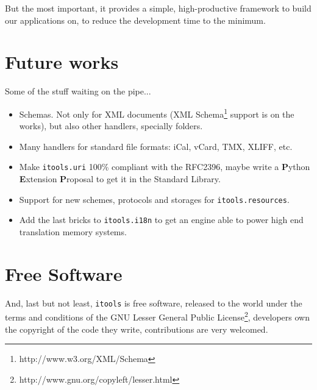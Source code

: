 But the most important, it provides a simple, high-productive framework
to build our applications on, to reduce the development time to the
minimum.

\section{Future works}

Some of the stuff waiting on the pipe...

\begin{itemize}
  \item Schemas. Not only for XML documents (XML
    Schema\footnote{http://www.w3.org/XML/Schema} support is on the works),
    but also other handlers, specially folders.

  \item Many handlers for standard file formats: iCal, vCard, TMX, XLIFF, etc.

  \item Make {\tt itools.uri} 100\% compliant with the RFC2396,
    maybe write a {\bf P}ython {\bf E}xtension {\bf P}roposal to
    get it in the Standard Library.

  \item Support for new schemes, protocols and storages for
    {\tt itools.resources}.

  \item Add the last bricks to {\tt itools.i18n} to get an engine able
    to power high end translation memory systems.
\end{itemize}


\section{Free Software}

And, last but not least, {\tt itools} is free software, released to the
world under the terms and conditions of the GNU Lesser General Public
License\footnote{http://www.gnu.org/copyleft/lesser.html}, developers
own the copyright of the code they write, contributions are very welcomed.
